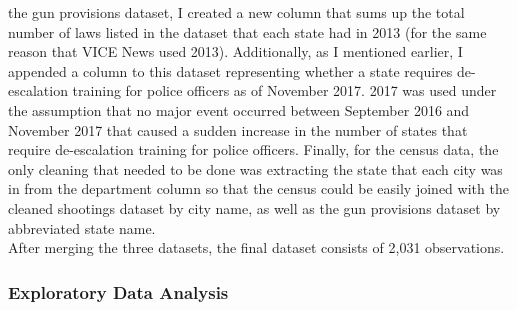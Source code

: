 \documentclass[
]{article}
\begin{document}
the gun provisions dataset, I created a new column that sums up the
total number of laws listed in the dataset that each state had in 2013
(for the same reason that VICE News used 2013). Additionally, as I
mentioned earlier, I appended a column to this dataset representing
whether a state requires de-escalation training for police officers as
of November 2017. 2017 was used under the assumption that no major event
occurred between September 2016 and November 2017 that caused a sudden
increase in the number of states that require de-escalation training for
police officers. Finally, for the census data, the only cleaning that
needed to be done was extracting the state that each city was in from
the department column so that the census could be easily joined with the
cleaned shootings dataset by city name, as well as the gun provisions
dataset by abbreviated state name.\\
\hspace*{0.333em}\hspace*{0.333em}\hspace*{0.333em}\hspace*{0.333em}\hspace*{0.333em}\hspace*{0.333em}\hspace*{0.333em}After
merging the three datasets, the final dataset consists of 2,031
observations.

\hypertarget{exploratory-data-analysis}{%
\subsubsection{Exploratory Data
Analysis}\label{exploratory-data-analysis}}
\end{document}
